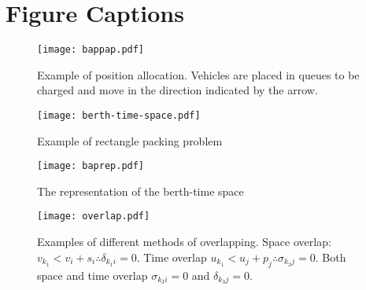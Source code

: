 % 

\section*{Figure Captions}

\begin{figure}[htpb]
    \centering
    \texttt{[image: bappap.pdf]}
    \caption{Example of position allocation. Vehicles are placed in queues to be charged and move in the direction indicated by the arrow.}
    \label{subfig:papexample}
\end{figure}




\begin{figure}[htpb]
\centering
    \texttt{[image: berth-time-space.pdf]}
    \caption{Example of rectangle packing problem}
    \label{fig:packexample}
\end{figure}

\begin{figure}[ht]
\centering
    \texttt{[image: baprep.pdf]}
    \caption{The representation of the berth-time space}
    \label{fig:bap}
\end{figure}

\begin{figure}[htpb]
\centering
    \texttt{[image: overlap.pdf]}
    \caption{Examples of different methods of overlapping. Space overlap: $v_{k_1} < v_{i} + s_i \therefore \delta_{k_{1}i} = 0$.
             Time overlap $u_{k_1} < u_{j} + p_j \therefore \sigma_{k_{2}j} = 0$. Both space and time overlap $\sigma_{k_{3}i} = 0$ and
             $\delta_{k_{3}j} = 0$.}
    \label{fig:multipleassign}
\end{figure}


